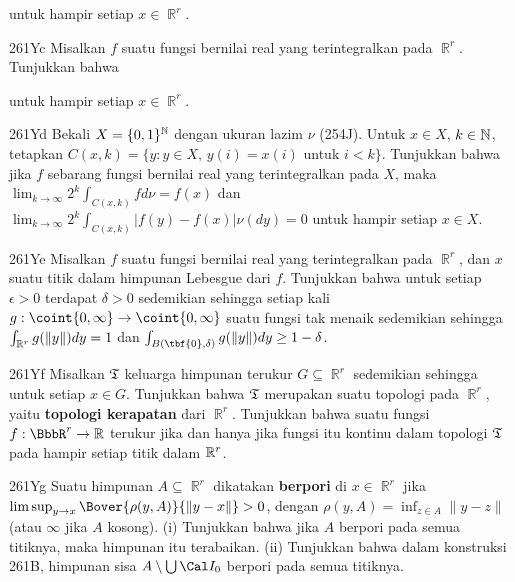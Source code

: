 { 
      
\noindent untuk hampir setiap $x\in\BbbR^r$. 
      
\spheader 261Yc Misalkan $f$ suatu fungsi bernilai real yang terintegralkan 
pada $\BbbR^r$. Tunjukkan bahwa 
      
      
\noindent untuk hampir setiap $x\in\BbbR^r$. 
      
\spheader 261Yd Bekali $X=\{0,1\}^{\Bbb N}$ dengan ukuran lazim $\nu$ 
(254J). Untuk $x\in X$, $k\in\Bbb N$, tetapkan 
$C(x,k)=\{y:y\in X,\,y(i)=x(i)$ untuk $i<k\}$. Tunjukkan bahwa jika $f$ 
sebarang fungsi bernilai real yang terintegralkan pada $X$, maka 
$\lim_{k\to\infty}2^k\int_{C(x,k)}fd\nu=f(x)$ dan 
$\lim_{k\to\infty}2^k\int_{C(x,k)}|f(y)-f(x)|\nu(dy)=0$ untuk hampir setiap 
$x\in X$. 
      
\spheader 261Ye Misalkan $f$ suatu fungsi bernilai real yang terintegralkan 
pada $\BbbR^r$, dan $x$ suatu titik dalam himpunan Lebesgue dari $f$. 
Tunjukkan bahwa untuk setiap $\epsilon>0$ terdapat $\delta>0$ sedemikian 
sehingga 
setiap kali 
$g:\coint{0,\infty}\to\coint{0,\infty}$ suatu fungsi tak menaik sedemikian 
sehingga $\int_{\Bbb R^r}g(\|y\|)dy=1$ dan 
$\int_{B(\tbf{0},\delta)}g(\|y\|)dy\ge 1-\delta$.  
      
\spheader 261Yf Misalkan $\frak T$ keluarga himpunan terukur 
$G\subseteq\BbbR^r$ sedemikian sehingga 
untuk setiap $x\in G$. 
Tunjukkan bahwa $\frak T$ merupakan suatu topologi pada $\BbbR^r$, yaitu 
{\bf topologi kerapatan} dari $\BbbR^r$. Tunjukkan bahwa suatu fungsi 
$f:\BbbR^r\to\Bbb R$ terukur jika dan hanya jika fungsi itu kontinu dalam 
topologi $\frak T$ pada hampir setiap titik dalam $\Bbb R^r$. 
      
\spheader 261Yg Suatu himpunan $A\subseteq\BbbR^r$ dikatakan {\bf berpori} 
di $x\in\BbbR^r$ jika 
$\limsup_{y\to x}\Bover{\rho(y,A)}{\|y-x\|}>0$, dengan 
$\rho(y,A)=\inf_{z\in A}\|y-z\|$ (atau $\infty$ jika $A$ kosong). 
(i) Tunjukkan bahwa jika $A$ berpori pada semua titiknya, maka himpunan itu 
terabaikan. 
(ii) Tunjukkan bahwa dalam konstruksi 261B, himpunan sisa 
$A\setminus\bigcup\Cal I_0$ berpori pada semua titiknya. 
 
}

